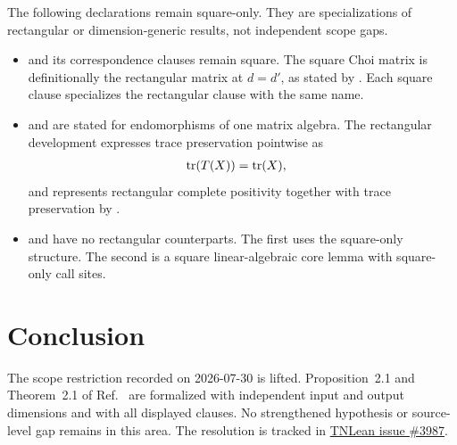 \documentclass{article}
\begin{document}
The following declarations remain square-only. They are specializations of
rectangular or dimension-generic results, not independent scope gaps.
\begin{itemize}
    \item {} and its correspondence clauses
        remain square. The square Choi matrix is definitionally the
        rectangular matrix at $d=d'$, as stated by
        . Each square
        clause specializes the rectangular clause with the same name.

    \item {} and  are stated for
        endomorphisms of one matrix algebra. The rectangular development
        expresses trace preservation pointwise as
        \begin{align}
            \operatorname{tr}(T(X))
                &=\operatorname{tr}(X),
            \label{eq:wolf_choi_rectangular_scope_pointwise_trace_preservation}
        \end{align}
        and represents rectangular complete positivity together with trace
        preservation by .

    \item {} and
         have no
        rectangular counterparts. The first uses the square-only
         structure. The second is a square linear-algebraic
        core lemma with square-only call sites.
\end{itemize}

\section{Conclusion}

The scope restriction recorded on 2026-07-30 is lifted. Proposition~2.1 and
Theorem~2.1 of Ref.~\cite{Wolf2012Quantum} are formalized with independent
input and output dimensions and with all displayed clauses. No strengthened
hypothesis or source-level gap remains in this area. The resolution is tracked
in
\href{https://github.com/LionSR/TNLean/issues/3987}{TNLean issue \#3987}.



\end{document}
